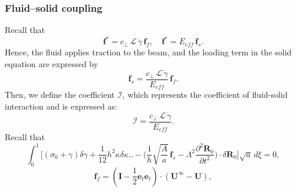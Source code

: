 \documentclass{beamer}
\begin{document}
\begin{frame}
	\frametitle{Fluid–solid coupling}
	\begin{overlayarea}{\textwidth}{\textheight}
Recall that
\begin{equation*}
	\label{eqn:102}
	\mathbf{f}^*=c_\perp\,\mathcal{L}\,\dot{\gamma}\,\mathbf{f}_{f}, \quad \mathbf{f}^*=E_{eff}\,\mathbf{f}_{s}.
\end{equation*}
Hence, the fluid applies traction to the beam, and the loading term in the solid equation are expressed by
\begin{equation*}
	\label{eqn:37}
	\textbf{f}_{s}=\frac{c_\perp\,\mathcal{L}\,\dot{\gamma}}{E_{eff}}\,\textbf{f}_{f}.
\end{equation*}
Then, we define the coefficient $\mathcal{I}$, which represents the coefficient of fluid-solid interaction and is expressed as:
\begin{equation*}
	\label{eqn:38}
	\mathcal{I}=\frac{c_\perp\,\mathcal{L}\,\dot{\gamma}}{E_{eff}}.
\end{equation*}
\tiny
Recall that
\begin{equation*}
		\int_0^1 \Bigg[ (\sigma_0 + \gamma) \delta \gamma 
		+ \frac{1}{12} h^2 \kappa \delta \kappa \Bigg. 
		\Bigg. - \Bigg( \frac{1}{h} \sqrt{\frac{A}{a}}\, \textbf{f}_s - \Lambda^2 \frac{\partial^2 \textbf{R}_0}{\partial t^2} \Bigg) 
		\cdot \delta \textbf{R}_0 \Bigg] \sqrt{a}\, d\xi = 0,
\end{equation*}
\begin{equation*}
	\mathbf{f}_f=\left(\mathbf{I}-\frac{1}{2}\mathbf{e}_t\mathbf{e}_t\right)\cdot(\mathbf{U}^{\infty}-\mathbf{U}),
\end{equation*}
	\end{overlayarea}
\end{frame}

\end{document}
